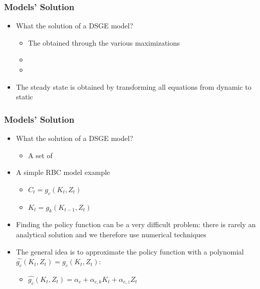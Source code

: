 \documentclass[xcolor=dvipsnames,handout,aspectratio=169]{beamer}
\begin{document}
\begin{frame}[c]\frametitle {\textbf{Models' Solution}} \label{conclusion}
\begin{itemize}
        \setlength\itemsep{1.5em}
   \item What {\color{Magenta}{characterizes}} the solution of a DSGE model?
   \begin{itemize}
       \item The {\color{Magenta}{optimality conditions}} obtained through the various maximizations
       \item {\color{Magenta}{Constraints}}
       \item {\color{Magenta}{Shock Processes}}
   \end{itemize}
   \item The steady state is obtained by transforming all equations from dynamic to static
\end{itemize}
\end{frame}

\begin{frame}[c]\frametitle {\textbf{Models' Solution}} \label{conclusion}
\begin{itemize}
        \setlength\itemsep{1.5em}
   \item What {\color{Magenta}{is}} the solution of a DSGE model?
   \begin{itemize}
       \item A set of {\color{Magenta}{policy functions}}
   \end{itemize}
   \item A simple RBC model example
\begin{itemize}
    \item $C_t = g_c(K_{t},Z_t)$ 
    \item $K_t = g_k(K_{t-1},Z_t)$
\end{itemize}
\item Finding the policy function can be a very difficult problem: there is rarely an analytical solution and we therefore use numerical techniques
\item The general idea is to approximate the policy function with a polynomial $\hat{g_c}(K_{t},Z_t) = g_c(K_{t},Z_t)$:
\begin{itemize}
    \item  $\hat{g_c}(K_{t},Z_t) = \alpha_c + \alpha_{c,k} K_t+ \alpha_{c,z} Z_t$
\end{itemize}
\end{itemize}
\end{frame}
\end{document}
